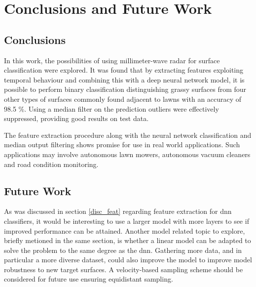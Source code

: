 \chapter{Conclusions and Future Work}

\section{Conclusions}

In this work, the possibilities of using millimeter-wave radar for surface classification were explored. It was found that by extracting features exploiting temporal behaviour and combining this with a deep neural network model, it is possible to perform binary classification distinguishing grassy surfaces from four other types of surfaces commonly found adjacent to lawns with an accuracy of 98.5 \%. Using a median filter on the prediction outliers were effectively suppressed, providing good results on test data. 

The feature extraction procedure along with the neural network classification and median output filtering shows promise for use in real world applications. Such applications may involve autonomous lawn mowers, autonomous vacuum cleaners and road condition monitoring. 



\section{Future Work}
As was discussed in section \ref{disc_feat} regarding feature extraction for \gls{dnn} classifiers, it would be interesting to use a larger model with more layers to see if improved performance can be attained. Another model related topic to explore, briefly metioned in the same section, is whether a linear model can be adapted to solve the problem to the same degree as the \gls{dnn}. Gathering more data, and in particular a more diverse dataset, could also improve the model to improve model robustness to new target surfaces. A velocity-based sampling scheme should be considered for future use ensuring equidistant sampling.



